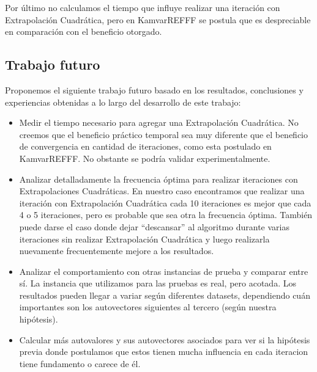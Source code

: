 Por último no calculamos el tiempo que influye realizar una iteración con
Extrapolación Cuadrática, pero en KamvarREFFF se postula que es despreciable en
comparación con el beneficio otorgado.

\subsection{Trabajo futuro}

Proponemos el siguiente trabajo futuro basado en los resultados, conclusiones y
experiencias obtenidas a lo largo del desarrollo de este trabajo:

\begin{itemize}

\item Medir el tiempo necesario para agregar una Extrapolación Cuadrática. No
creemos que el beneficio práctico temporal sea muy diferente que el beneficio
de convergencia en cantidad de iteraciones, como esta postulado en KamvarREFFF.
No obstante se podría validar experimentalmente.

\item Analizar detalladamente la frecuencia óptima para realizar iteraciones
con Extrapolaciones Cuadráticas. En nuestro caso encontramos que realizar una
iteración con Extrapolación Cuadrática cada 10 iteraciones es mejor que cada 4
o 5 iteraciones, pero es probable que sea otra la frecuencia óptima. También
puede darse el caso donde dejar ``descansar'' al algoritmo durante varias
iteraciones sin realizar Extrapolación Cuadrática y luego realizarla nuevamente
frecuentemente mejore a los resultados.

\item Analizar el comportamiento con otras instancias de prueba y comparar
entre sí. La instancia que utilizamos para las pruebas es real, pero acotada.
Los resultados pueden llegar a variar según diferentes datasets, dependiendo
cuán importantes son los autovectores siguientes al tercero (según nuestra
hipótesis).

\item Calcular más autovalores y sus autovectores asociados para ver si la
hipótesis previa donde postulamos que estos tienen mucha influencia en cada
iteracion tiene fundamento o carece de él.

\end{itemize}
